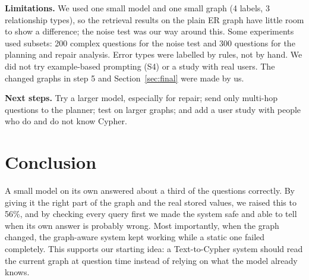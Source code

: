 \documentclass[11pt,a4paper]{article}
\begin{document}
\textbf{Limitations.} We used one small model and one small graph (4 labels, 3 relationship
types), so the retrieval results on the plain ER graph have little room to show a difference;
the noise test was our way around this. Some experiments used subsets: 200 complex questions
for the noise test and 300 questions for the planning and repair analysis. Error types were
labelled by rules, not by hand. We did not try example-based prompting (S4) or a study with
real users. The changed graphs in step 5 and Section~\ref{sec:final} were made by us.

\textbf{Next steps.} Try a larger model, especially for repair; send only multi-hop questions
to the planner; test on larger graphs; and add a user study with people who do and do not know
Cypher.

\section{Conclusion}

A small model on its own answered about a third of the questions correctly. By giving it the
right part of the graph and the real stored values, we raised this to 56\%, and by checking
every query first we made the system safe and able to tell when its own answer is probably
wrong. Most importantly, when the graph changed, the graph-aware system kept working while a
static one failed completely. This supports our starting idea: a Text-to-Cypher system should
read the current graph at question time instead of relying on what the model already knows.
\end{document}
